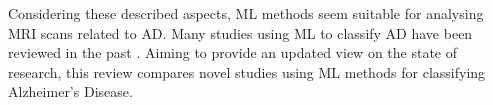 Considering these described aspects, \gls{ML} methods seem suitable for analysing MRI scans related to \gls{AD}. Many studies using \gls{ML} to classify \gls{AD} have been reviewed in the past \autocite[see][]{ebrahimighahnaviehDeepLearningDetect2020,joDeepLearningAlzheimer2019, tanveerMachineLearningTechniques2020, wenConvolutionalNeuralNetworks2020, noorApplicationDeepLearning2020}. Aiming to provide an updated view on the state of research, this review compares novel studies using \gls{ML} methods for classifying Alzheimer's Disease.







